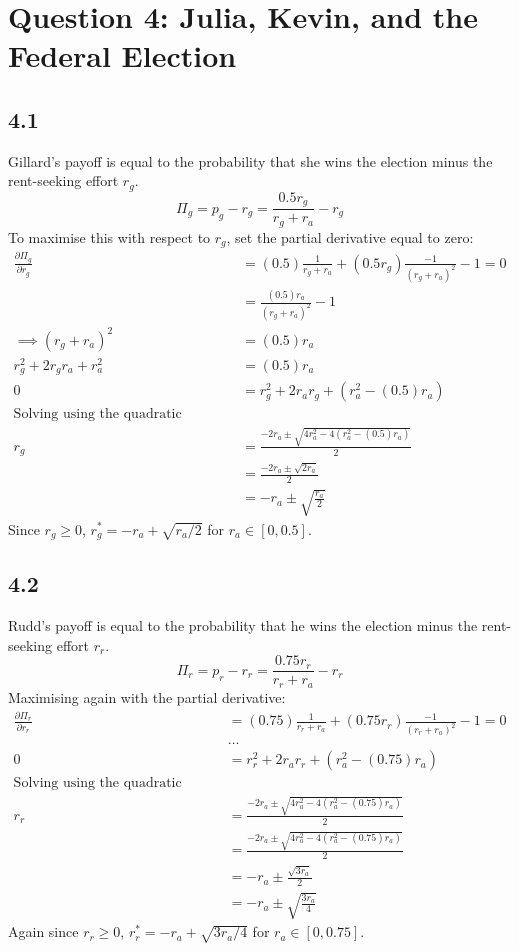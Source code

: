 \documentclass{article}
\begin{document}
\section*{Question 4: Julia, Kevin, and the Federal Election}
\subsection*{4.1}
Gillard's payoff is equal to the probability that she wins the election minus the rent-seeking effort $r_{g}$.
$$\Pi_{g} = p_{g} - r_{g} = \frac{0.5 r_{g}}{r_{g} + r_{a}} - r_{g}$$
To maximise this with respect to $r_{g}$, set the partial derivative equal to zero:
\begin{align*}
    \frac{\partial \Pi_{g}}{\partial r_{g}} &= (0.5)\frac{1}{r_{g} + r_{a}} + (0.5 r_{g})\frac{-1}{(r_{g} + r_{a})^2} - 1 = 0\\
    &= \frac{(0.5)r_{a}}{(r_{g} + r_{a})^{2}} - 1\\
    \implies (r_{g} + r_{a})^{2} &= (0.5)r_{a}\\
    r_{g}^2 + 2r_{g}r_{a} + r_{a}^2 &= (0.5)r_{a}\\
    0 &= r_{g}^2 + 2r_{a}r_{g} + (r_{a}^2 - (0.5)r_{a})\\
    \mbox{Solving using the quadratic formula:}\\
    r_{g} &= \frac{-2 r_{a} \pm \sqrt{4 r_{a}^{2} - 4(r_{a}^2 - (0.5)r_{a})}}{2}\\
    &= \frac{-2 r_{a} \pm \sqrt{2 r_{a}}}{2}\\
    &= -r_{a} \pm \sqrt{\frac{r_{a}}{2}}
\end{align*}
Since $r_{g} \geq 0$, $r_{g}^{*} = -r_{a} + \sqrt{{r_{a}}/{2}}$ for $r_{a} \in [0, 0.5]$.

\subsection*{4.2}
Rudd's payoff is equal to the probability that he wins the election minus the rent-seeking effort $r_{r}$.
$$\Pi_{r} = p_{r} - r_{r} = \frac{0.75 r_{r}}{r_{r} + r_{a}} - r_{r}$$
Maximising again with the partial derivative:
\begin{align*}
    \frac{\partial \Pi_{r}}{\partial r_{r}} &= (0.75)\frac{1}{r_{r} + r_{a}} + (0.75 r_{r})\frac{-1}{(r_{r} + r_{a})^2} - 1 = 0\\
    &\dots\\
    0 &= r_{r}^2 + 2r_{a}r_{r} + (r_{a}^2 - (0.75)r_{a})\\
    \mbox{Solving using the quadratic formula:}\\
    r_{r} &= \frac{-2 r_{a} \pm \sqrt{4 r_{a}^{2} - 4(r_{a}^2 - (0.75)r_{a})}}{2}\\
    &= \frac{-2 r_{a} \pm \sqrt{4 r_{a}^{2} - 4(r_{a}^2 - (0.75)r_{a})}}{2}\\
    &= -r_{a} \pm \frac{\sqrt{3 r_{a}}}{2}\\
    &= -r_{a} \pm \sqrt{\frac{3 r_{a}}{4}}
\end{align*}
Again since $r_{r} \geq 0$, $r_{r}^{*} = -r_{a} + \sqrt{{3 r_{a}}/{4}}$ for $r_{a} \in [0, 0.75]$.
\end{document}
